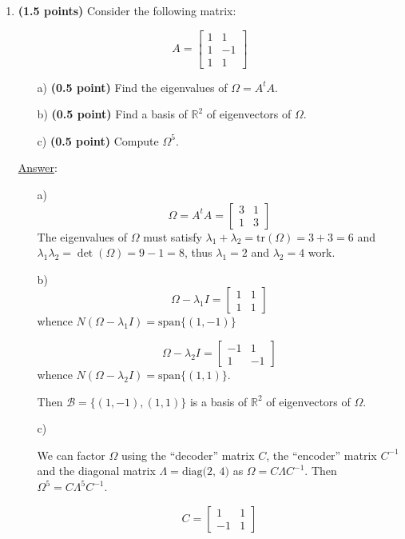 \documentclass[]{book}
\theoremstyle{definition}
\newcommand\ans{\underline{Answer}: }
\begin{document}
\begin{enumerate}

\item {\bf (1.5 points)}  Consider the following matrix:

\[
A = 
\begin{bmatrix}
1 & 1 \\
1 & -1 \\
1 & 1 
\end{bmatrix}
\]

\begin{itemize}
\item[a)] {\bf (0.5 point)} Find the eigenvalues of $\Omega=A^tA$.
\item[b)] {\bf (0.5 point)} Find a basis of $\mathbb{R}^2$ of eigenvectors of $\Omega$.
\item[c)] {\bf (0.5 point)} Compute $\Omega^5$.
\end{itemize}

\ans
\begin{itemize}
\item[a)] 
\[
\Omega = A^tA = 
\begin{bmatrix}
3 & 1 \\
1 & 3
\end{bmatrix}
\]
The eigenvalues of $\Omega$ must satisfy $\lambda_1 + \lambda_2 = \textrm{tr}(\Omega) = 3 + 3 = 6$ 
and $\lambda_1\lambda_2 = \det(\Omega) = 9 - 1 = 8$, thus $\lambda_1=2$ and $\lambda_2=4$ work.

\item[b)]
\[
\Omega - \lambda_1I =  
\begin{bmatrix}
1 & 1 \\
1 & 1
\end{bmatrix}
\] whence $N(\Omega - \lambda_1I) = \textrm{span}\{(1,-1)\}$

\[
\Omega - \lambda_2I =  
\begin{bmatrix}
-1 & 1 \\
1 & -1
\end{bmatrix}
\] whence $N(\Omega - \lambda_2I) = \textrm{span}\{(1,1)\}$. 

Then $\mathcal{B} = \{(1,-1), (1,1)\}$ is a basis of $\mathbb{R}^2$ of eigenvectors of $\Omega$. 


\item[c)]

We can  factor $\Omega$ using the ``decoder'' matrix $C$, the ``encoder'' matrix $C^{-1}$ and the diagonal matrix $\Lambda=\textrm{diag(2, 4)}$ as $\Omega = C \Lambda C^{-1}$. Then $\Omega^5 = C \Lambda^5 C^{-1}$.

\[
C =  
\begin{bmatrix}
1 & 1 \\
-1 & 1
\end{bmatrix}
\]


\end{itemize}
\end{enumerate}
\end{document}
